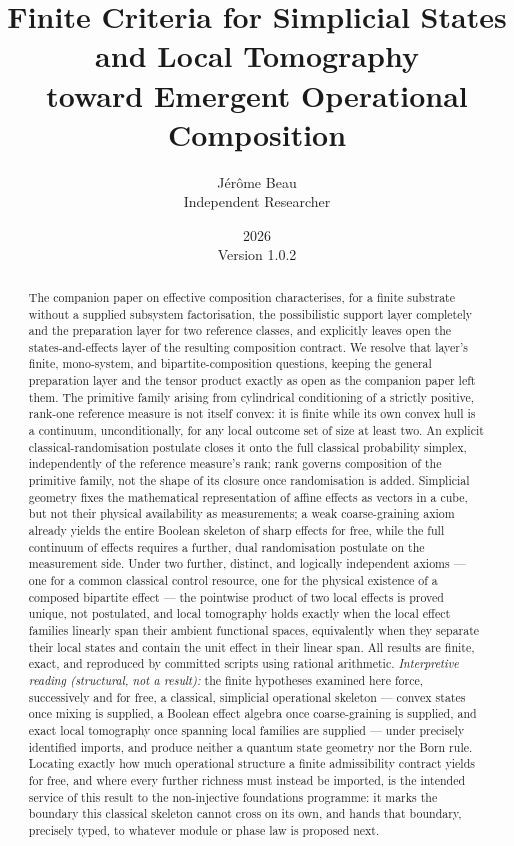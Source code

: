 \documentclass[11pt,a4paper]{article}
\title{Finite Criteria for Simplicial States and Local Tomography\\
toward Emergent Operational Composition}
\author{J\'{e}r\^{o}me Beau\\
\small Independent Researcher}
\date{2026\\[2pt]\small Version 1.0.2}
\begin{document}
  \maketitle

  \begin{abstract}
    The companion paper on effective composition characterises, for a finite substrate without a supplied
    subsystem factorisation, the possibilistic support layer completely and the preparation layer for two
    reference classes, and explicitly leaves open the states-and-effects layer of the resulting composition
    contract.
    We resolve that layer's finite, mono-system, and bipartite-composition questions, keeping the general
    preparation layer and the tensor product exactly as open as the companion paper left them.
    The primitive family arising from cylindrical conditioning of a strictly positive, rank-one reference
    measure is not itself convex: it is finite while its own convex hull is a continuum, unconditionally, for
    any local outcome set of size at least two.
    An explicit classical-randomisation postulate closes it onto the full classical probability simplex,
    independently of the reference measure's rank; rank governs composition of the primitive family, not the
    shape of its closure once randomisation is added.
    Simplicial geometry fixes the mathematical representation of affine effects as vectors in a cube, but not
    their physical availability as measurements; a weak coarse-graining axiom already yields the entire
    Boolean skeleton of sharp effects for free, while the full continuum of effects requires a further,
    dual randomisation postulate on the measurement side.
    Under two further, distinct, and logically independent axioms --- one for a common classical control
    resource, one for the physical existence of a composed bipartite effect --- the pointwise product of two
    local effects is proved unique, not postulated, and local tomography holds exactly when the local effect
    families linearly span their ambient functional spaces, equivalently when they separate their local
    states and contain the unit effect in their linear span.
    All results are finite, exact, and reproduced by committed scripts using rational arithmetic.
    \emph{Interpretive reading (structural, not a result):} the finite hypotheses examined here force,
    successively and for free, a classical, simplicial operational skeleton --- convex states once mixing is
    supplied, a Boolean effect algebra once coarse-graining is supplied, and exact local tomography once
    spanning local families are supplied --- under precisely identified imports, and produce neither a
    quantum state geometry nor the Born rule.
    Locating exactly how much operational structure a finite admissibility contract yields for free, and
    where every further richness must instead be imported, is the intended service of this result to the
    non-injective foundations programme: it marks the boundary this classical skeleton cannot cross on its
    own, and hands that boundary, precisely typed, to whatever module or phase law is proposed next.
  \end{abstract}
\end{document}

